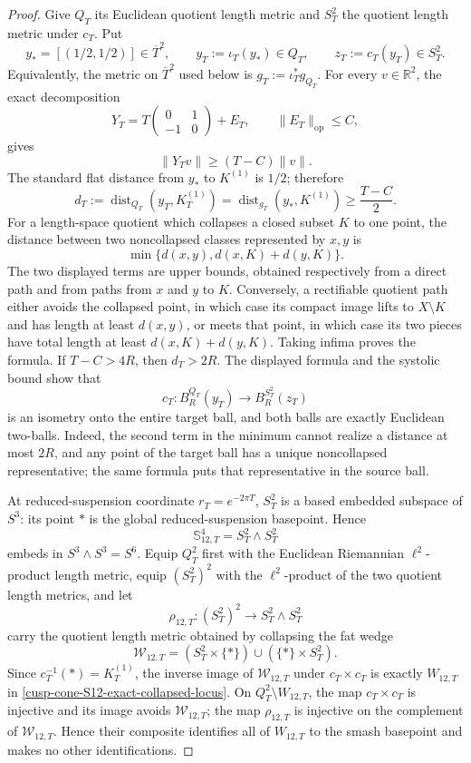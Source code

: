 \begin{proof}
Give \(Q_T\) its Euclidean quotient length metric and \(S_T^2\) the quotient
length metric under \(c_T\).  Put
\[
 y_*=[(1/2,1/2)]\in\overline T^2,
 \qquad y_T:=\iota_T(y_*)\in Q_T,
 \qquad z_T:=c_T(y_T)\in S_T^2.
\]
Equivalently, the metric on \(\overline T^2\) used below is
\(g_T:=\iota_T^*g_{Q_T}\).  For every \(v\in\mathbb R^2\), the exact
decomposition
\[
 Y_T=T\begin{pmatrix}0&1\\-1&0\end{pmatrix}+E_T,
 \qquad\|E_T\|_{\mathrm{op}}\leq C,
\]
gives
\[
 \|Y_Tv\|\geq(T-C)\|v\|.
\]
The standard flat distance from \(y_*\) to \(K^{(1)}\) is \(1/2\);
therefore
\begin{equation}
 d_T:=\operatorname{dist}_{Q_T}(y_T,K_T^{(1)})
 =\operatorname{dist}_{g_T}(y_*,K^{(1)})
 \geq\frac{T-C}{2}.
 \label{cusp-cone-distance-to-skeleton}
\end{equation}
For a length-space quotient which collapses a closed subset \(K\) to one
point, the distance between two noncollapsed classes represented by \(x,y\)
is
\[
 \min\{d(x,y),d(x,K)+d(y,K)\}.
\]
The two displayed terms are upper bounds, obtained respectively from a
direct path and from paths from \(x\) and \(y\) to \(K\).  Conversely, a
rectifiable quotient path either avoids the collapsed point, in which case
its compact image lifts to \(X\setminus K\) and has length at least
\(d(x,y)\), or meets that point, in which case its two pieces have total
length at least \(d(x,K)+d(y,K)\).  Taking infima proves the formula.
If \(T-C>4R\), then \(d_T>2R\).  The displayed formula and the systolic
bound show that
\[
 c_T:B_R^{Q_T}(y_T)\longrightarrow B_R^{S_T^2}(z_T)
\]
is an isometry onto the entire target ball, and both balls are exactly
Euclidean two-balls.  Indeed, the second term in the minimum cannot realize
a distance at most \(2R\), and any point of the target ball has a unique
noncollapsed representative; the same formula puts that representative in
the source ball.

At reduced-suspension coordinate \(r_T=e^{-2\pi T}\), \(S_T^2\) is a based
embedded subspace of \(S^3\): its point \(*\) is the global
reduced-suspension basepoint.  Hence
\[
 \mathbb S_{12,T}^4=S_T^2\wedge S_T^2
\]
embeds in \(S^3\wedge S^3=S^6\).  Equip \(Q_T^2\) first with the Euclidean
Riemannian \(\ell^2\)-product length metric, equip \((S_T^2)^2\) with the
\(\ell^2\)-product of the two quotient length metrics, and let
\[
 \rho_{12,T}:(S_T^2)^2\longrightarrow S_T^2\wedge S_T^2
\]
carry the quotient length metric obtained by collapsing the fat wedge
\[
 \mathcal W_{12,T}
 =(S_T^2\times\{*\})\cup(\{*\}\times S_T^2).
\]
Since \(c_T^{-1}(*)=K_T^{(1)}\), the inverse image of
\(\mathcal W_{12,T}\) under \(c_T\times c_T\) is exactly \(W_{12,T}\) in
\cref{cusp-cone-S12-exact-collapsed-locus}.  On
\(Q_T^2\setminus W_{12,T}\), the map \(c_T\times c_T\) is injective and its
image avoids \(\mathcal W_{12,T}\); the map \(\rho_{12,T}\) is injective on
the complement of \(\mathcal W_{12,T}\).  Hence their composite identifies
all of \(W_{12,T}\) to the smash basepoint and makes no other
identifications.


\end{proof}

